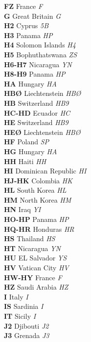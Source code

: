 \documentclass[landscape,a4paper]{article}
\begin{document}
\begin{multicols}{7}
\textbf{FZ} France \emph{F} \\
\textbf{G} Great Britain \emph{G} \\
\textbf{H2} Cyprus \emph{5B} \\
\textbf{H3} Panama \emph{HP} \\
\textbf{H4} Solomon Islands \emph{H4} \\
\textbf{H5} Bophuthatswana \emph{ZS} \\
\textbf{H6-H7} Nicaragua \emph{YN} \\
\textbf{H8-H9} Panama \emph{HP} \\
\textbf{HA} Hungary \emph{HA} \\
\textbf{HBØ} Liechtenstein \emph{HBØ} \\
\textbf{HB} Switzerland \emph{HB9} \\
\textbf{HC-HD} Ecuador \emph{HC} \\
\textbf{HE} Switzerland \emph{HB9} \\
\textbf{HEØ} Liechtenstein \emph{HBØ} \\
\textbf{HF} Poland \emph{SP} \\
\textbf{HG} Hungary \emph{HA} \\
\textbf{HH} Haiti \emph{HH} \\
\textbf{HI} Dominican Republic \emph{HI} \\
\textbf{HJ-HK} Colombia \emph{HK} \\
\textbf{HL} South Korea \emph{HL} \\
\textbf{HM} North Korea \emph{HM} \\
\textbf{HN} Iraq \emph{YI} \\
\textbf{HO-HP} Panama \emph{HP} \\
\textbf{HQ-HR} Honduras \emph{HR} \\
\textbf{HS} Thailand \emph{HS} \\
\textbf{HT} Nicaragua \emph{YN} \\
\textbf{HU} EL Salvador \emph{YS} \\
\textbf{HV} Vatican City \emph{HV} \\
\textbf{HW-HY} France \emph{F} \\
\textbf{HZ} Saudi Arabia \emph{HZ} \\
\textbf{I} Italy \emph{I} \\
\textbf{IS} Sardinia \emph{I} \\
\textbf{IT} Sicily \emph{I} \\
\textbf{J2} Djibouti \emph{J2} \\
\textbf{J3} Grenada \emph{J3} \\

\end{multicols}
\end{document}
